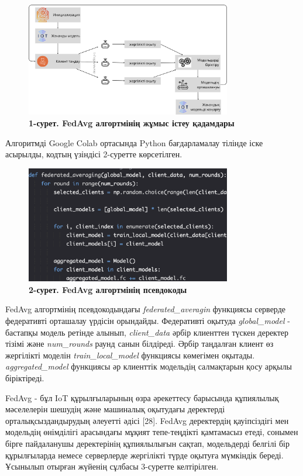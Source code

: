 \begin{figure}[H]
	\centering
	\includegraphics[width=0.8\textwidth]{assets/199}
	\caption*{\bfseries 1-сурет. FedAvg алгортмінің жұмыс істеу қадамдары}
\end{figure}



Алгоритмді Google Colab ортасында Python бағдарламалау тілінде іске
асырылды, кодтың үзіндісі 2-суретте көрсетілген.

\begin{figure}[H]
	\centering
	\includegraphics[width=0.8\textwidth]{assets/200}
	\caption*{\bfseries 2-сурет. FedAvg алгортмінің псевдокоды}
\end{figure}



FedAvg алгортмінің псевдокодындағы \emph{federated\_averagin} функциясы
серверде федеративті орташалау үрдісін орындайды. Федеративті оқытуда
\emph{global\_model} - бастапқы модель ретінде алынып,
\emph{client\_data} әрбір клиенттен түскен деректер тізімі және
\emph{num\_rounds} раунд санын білдіреді. Әрбір таңдалған клиент өз
жергілікті моделін \emph{train\_local\_model} функциясы көмегімен
оқытады. \emph{aggregated\_model} функциясы әр клиенттік модельдің
салмақтарын қосу арқылы біріктіреді.

FedAvg - бұл IoT құрылғыларының өзра әрекеттесу барысында құпиялылық
мәселелерін шешудің және машиналық оқытудағы деректерді
орталықсыздандырудың әлеуетті әдісі {[}28{]}. FedAvg деректердің
қауіпсіздігі мен модельдің өнімділігі арасындағы мұқият тепе-теңдікті
қамтамасыз етеді, сонымен бірге пайдаланушы деректерінің құпиялылығын
сақтап, модельдерді белгілі бір құрылғыларда немесе серверлерде
жергілікті түрде оқытуға мүмкіндік береді. Ұсынылып отырған жүйенің
сұлбасы 3-суретте келтірілген.

